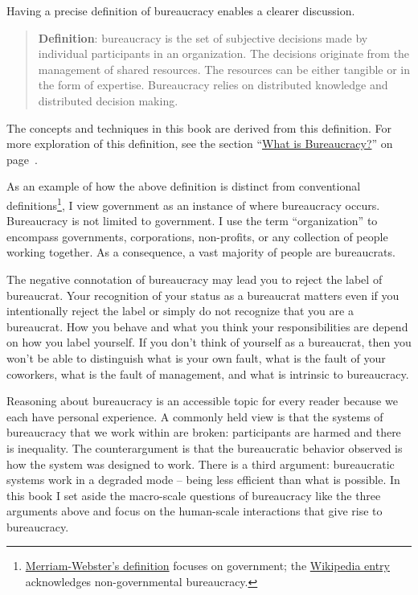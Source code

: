 Having a precise definition of bureaucracy enables a clearer discussion. 
\begin{quote}
\textbf{Definition}: \Gls{bureaucracy} is the set of subjective decisions made by individual participants in an organization. The decisions originate from the management of shared resources. The resources can be either tangible or in the form of expertise. Bureaucracy relies on distributed knowledge and distributed decision making. 
\end{quote}

The concepts and techniques in this book are derived from this definition. For more exploration of this definition, see the section ``\hyperref[sec:define-bureaucracy]{What is Bureaucracy?}'' on page~\pageref{sec:define-bureaucracy}.

As an example of how the above definition is distinct from conventional definitions\footnote{\href{https://www.merriam-webster.com/dictionary/bureaucracy}{Merriam-Webster's definition} focuses on government; the \href{https://en.wikipedia.org/wiki/Bureaucracy}{Wikipedia entry}
acknowledges non-governmental bureaucracy.}, I view government as an instance of where bureaucracy occurs. Bureaucracy is not limited to government. I use the term ``organization'' to encompass governments, corporations, non-profits, or any collection of people working together. As a consequence, a vast majority of people are bureaucrats. 

The negative connotation of bureaucracy may lead you to reject the label of bureaucrat. Your recognition of your status as a bureaucrat matters even if you intentionally reject the label or simply do not recognize that you are a bureaucrat. How you behave and what you think your responsibilities are depend on how you label yourself.
If you don't think of yourself as a bureaucrat, then you won't be able to distinguish what is your own fault, what is the fault of your coworkers, what is the fault of management, and what is intrinsic to bureaucracy. 

Reasoning about bureaucracy is an accessible topic for every reader because we each have personal experience.
A commonly held view is that the systems of bureaucracy that we work within are broken: participants are harmed and there is inequality. 
The counterargument is that the bureaucratic behavior observed is how the system was designed to work. There is a third argument: bureaucratic systems work in a degraded mode -- being less efficient than what is possible. 
In this book I set aside the macro-scale questions of bureaucracy like the three arguments above and focus on the human-scale interactions that give rise to bureaucracy.

